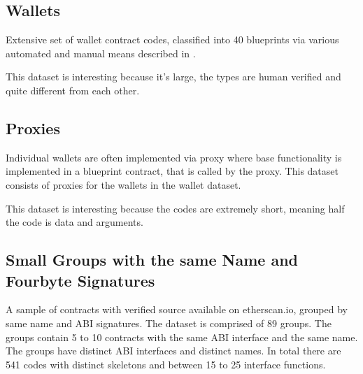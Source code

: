 \documentclass[../main.tex]{subfiles}
\begin{document}
\subsection{Wallets \label{sec:wallets}}
Extensive set of wallet contract codes, classified into 40 blueprints via various automated and manual means described in .

This dataset is interesting because it's large, the types are human verified and quite different from each other.

\subsection{Proxies \label{sec:proxies}}
Individual wallets are often implemented via proxy where base functionality is implemented in a blueprint contract, that is called by the proxy. This dataset consists of proxies for the wallets in the wallet dataset.

This dataset is interesting because the codes are extremely short, meaning half the code is data and arguments.

\subsection{Small Groups with the same Name and Fourbyte Signatures \label{sec:abiGroups}}
A sample of contracts with verified source available on etherscan.io, grouped by same name and ABI signatures. The dataset is comprised of 89 groups. The groups contain 5 to 10 contracts with the same ABI interface and the same name. The groups have distinct ABI interfaces and distinct names.
In total there are 541 codes with distinct skeletons and between 15 to 25 interface functions.
\end{document}

